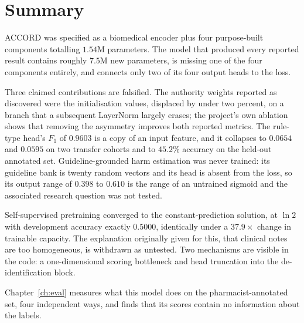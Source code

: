 \section{Summary}
\label{sec:arch-summary}

ACCORD was specified as a biomedical encoder plus four purpose-built components
totalling $1.54$M parameters. The model that produced every reported result
contains roughly $7.5$M new parameters, is missing one of the four components
entirely, and connects only two of its four output heads to the loss.

Three claimed contributions are falsified. The authority weights reported as
discovered were the initialisation values, displaced by under two percent, on a
branch that a subsequent LayerNorm largely erases; the project's own ablation
shows that removing the asymmetry improves both reported metrics. The
rule-type head's $F_1$ of $0.9603$ is a copy of an input feature, and it
collapses to $0.0654$ and $0.0595$ on two transfer cohorts and to $45.2\%$
accuracy on the held-out annotated set. Guideline-grounded harm estimation was
never trained: its guideline bank is twenty random vectors and its head is
absent from the loss, so its output range of $0.398$ to $0.610$ is the range of
an untrained sigmoid and the associated research question was not tested.

Self-supervised pretraining converged to the constant-prediction solution, at
$\ln 2$ with development accuracy exactly $0.5000$, identically under a
$37.9\times$ change in trainable capacity. The explanation originally given for
this, that clinical notes are too homogeneous, is withdrawn as untested. Two
mechanisms are visible in the code: a one-dimensional scoring bottleneck and
head truncation into the de-identification block.

Chapter~\ref{ch:eval} measures what this model does on the pharmacist-annotated
set, four independent ways, and finds that its scores contain no information
about the labels.
